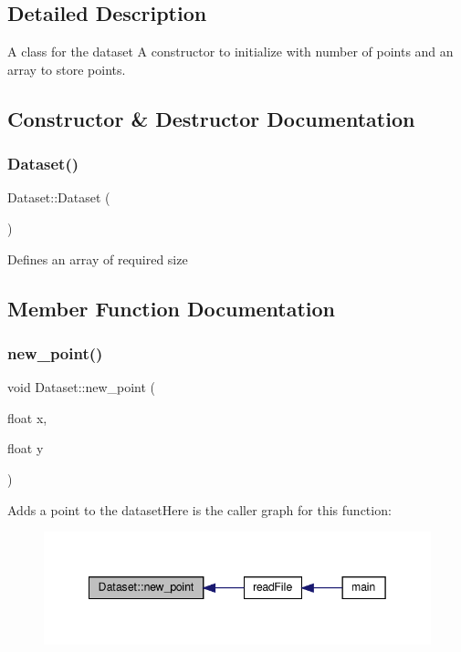 \subsection{Detailed Description}
A class for the dataset  A constructor to initialize with number of points and an array to store points. 

\subsection{Constructor \& Destructor Documentation}
\mbox{\label{classDataset_a2ef0a4a688a218d55ef061c6df659a4a}} 
\subsubsection{\texorpdfstring{Dataset()}{Dataset()}}
{\footnotesize\ttfamily Dataset\+::\+Dataset (\begin{DoxyParamCaption}{ }\end{DoxyParamCaption})\hspace{0.3cm}{\ttfamily [inline]}}

Defines an array of required size

\subsection{Member Function Documentation}
\mbox{\label{classDataset_ad5ab44474be3c0648df25f3752916576}} 
\subsubsection{\texorpdfstring{new\+\_\+point()}{new\_point()}}
{\footnotesize\ttfamily void Dataset\+::new\+\_\+point (\begin{DoxyParamCaption}\item[{float}]{x,  }\item[{float}]{y }\end{DoxyParamCaption})\hspace{0.3cm}{\ttfamily [inline]}}

Adds a point to the datasetHere is the caller graph for this function\+:\nopagebreak
\begin{figure}[H]
\begin{center}
\leavevmode
\includegraphics[width=342pt]{classDataset_ad5ab44474be3c0648df25f3752916576_icgraph}
\end{center}
\end{figure}


